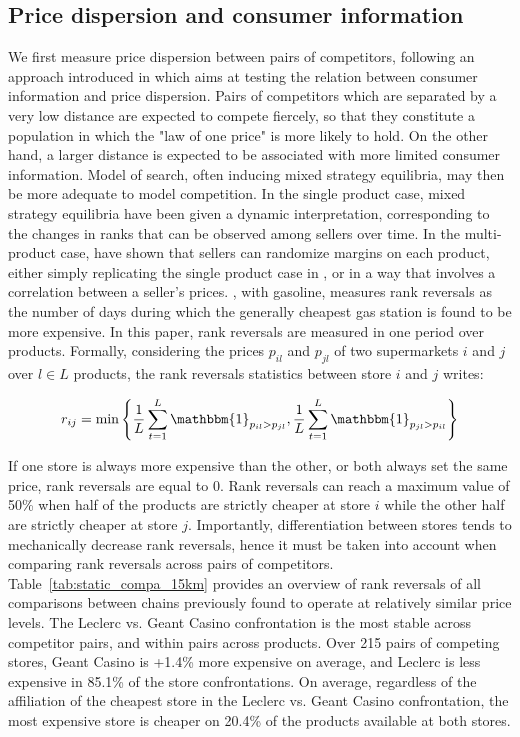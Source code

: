 \documentclass[english]{article}
\begin{document}
\subsection{Price dispersion and consumer information}

We first measure price dispersion between pairs of competitors, following an approach introduced in \cite{TAP11} which aims at testing the relation between consumer information and price dispersion. Pairs of competitors which are separated by a very low distance are expected to compete fiercely, so that they constitute a population in which the "law of one price" is more likely to hold. On the other hand, a larger distance is expected to be associated with more limited consumer information. Model of search, often inducing mixed strategy equilibria, may then be more adequate to model competition. In the single product case, mixed strategy equilibria have been given a dynamic interpretation, corresponding to the changes in ranks that can be observed among sellers over time. In the multi-product case, \cite{MCA95} have shown that sellers can randomize margins on each product, either simply replicating the single product case in \cite{VAR80}, or in a way that involves a correlation between a seller's prices. \cite{TAP11}, with gasoline, measures rank reversals as the number of days during which the generally cheapest gas station is found to be more expensive. In this paper, rank reversals are measured in one period over products. Formally, considering the prices $p_{il}$ and $p_{jl}$ of two supermarkets $i$ and $j$ over $l \in L$ products, the rank reversals statistics between store $i$ and $j$ writes:

\begin{align}
r_{ij} = \min\left\{\frac{1}{L} \sum_{t=1}^{L} \mathbbm{1}_{p_{il} > p_{jl}}, \frac{1}{L} \sum_{t=1}^{L} \mathbbm{1}_{p_{jl} > p_{il}}\right\}
\label{formula_rr_static}
\end{align}


If one store is always more expensive than the other, or both always set the same price, rank reversals are equal to 0. Rank reversals can reach a maximum value of 50\% when half of the products are strictly cheaper at store $i$ while the other half are strictly cheaper at store $j$. Importantly, differentiation between stores tends to mechanically decrease rank reversals, hence it must be taken into account when comparing rank reversals across pairs of competitors. Table~\ref{tab:static_compa_15km} provides an overview of rank reversals of all comparisons between chains previously found to operate at relatively similar price levels. The Leclerc vs. Geant Casino confrontation is the most stable across competitor pairs, and within pairs across products. Over 215 pairs of competing stores, Geant Casino is +1.4\% more expensive on average, and Leclerc is less expensive in 85.1\% of the store confrontations. On average, regardless of the affiliation of the cheapest store in the Leclerc vs. Geant Casino confrontation, the most expensive store is cheaper on 20.4\% of the products available at both stores.
\end{document}
